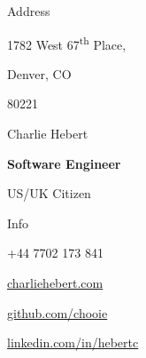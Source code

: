 \noindent
\begin{minipage}[t]{0.333\textwidth}
  {\huge Address}

  \setlength{\parskip}{0.4cm}

  1782 West 67\textsuperscript{th} Place,
  
  Denver, CO
  
  80221
\end{minipage}
\noindent
\begin{minipage}[t]{0.333\textwidth}
  \vspace*{\fill}
  \begin{center}
    {\Huge Charlie Hebert}

    \setlength{\parskip}{0.5cm}
    
    \textbf{Software Engineer}
    
    US/UK Citizen
  \end{center}
  \vspace*{\fill}
\end{minipage}
\noindent
\begin{minipage}[t]{0.333\textwidth}
  \begin{flushright}
    {\huge Info}\\
  \end{flushright}

  \begin{description}
    \raggedleft
    \item[Mob] +44 7702 173 841
    \item[Web] \href{http://www.charliehebert.com}{charliehebert.com}
    \item[Github] \href{http://www.github.com/chooie}{github.com/chooie}
    \item[LinkedIn] \href{http://linkedin.com/in/hebertc}{linkedin.com/in/hebertc}
  \end{description}
\end{minipage}

